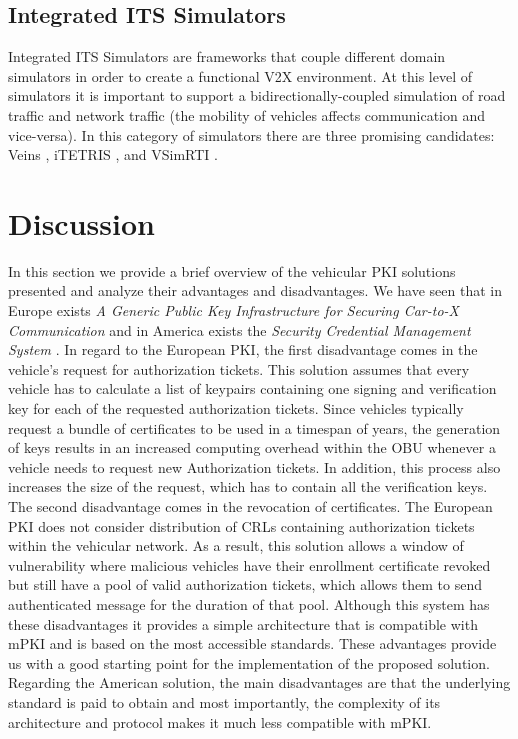 \subsection{Integrated ITS Simulators}
Integrated ITS Simulators are frameworks that couple different domain simulators in order to create a functional V2X environment. At this level of simulators it is important to support a bidirectionally-coupled simulation \cite{bidirectional} of road traffic and network traffic (the mobility of vehicles affects communication and vice-versa). In this category of simulators there are three promising candidates: Veins \cite{bidirectional}, iTETRIS \cite{iTetris}, and VSimRTI \cite{vsimrti}.


\section{Discussion}
In this section we provide a brief overview of the vehicular PKI solutions presented and analyze their advantages and disadvantages.
We have seen that in Europe exists \textit{A Generic Public Key Infrastructure for Securing Car-to-X Communication} \cite{generic_eu} and in America exists the \textit{Security Credential Management System} \cite{scms}. In regard to the European PKI, the first disadvantage comes in the vehicle's request for authorization tickets. This solution assumes that every vehicle has to calculate a list of keypairs containing one signing and verification key for each of the requested authorization tickets. Since vehicles typically request a bundle of certificates to be used in a timespan of years, the generation of keys results in an increased computing overhead within the OBU whenever a vehicle needs to request new Authorization tickets. In addition, this process also increases the size of the request, which has to contain all the verification keys. The second disadvantage comes in the revocation of certificates. The European PKI does not consider distribution of CRLs containing authorization tickets within the vehicular network. As a result, this solution allows a window of vulnerability where malicious vehicles have their enrollment certificate revoked but still have a pool of valid authorization tickets, which allows them to send authenticated message for the duration of that pool. Although this system has these disadvantages it provides a simple architecture that is compatible with mPKI and is based on the most accessible standards. These advantages provide us with a good starting point for the implementation of the proposed solution. Regarding the American solution, the main disadvantages are that the underlying standard is paid to obtain and most importantly, the complexity of its architecture and protocol makes it much less compatible with mPKI. 

